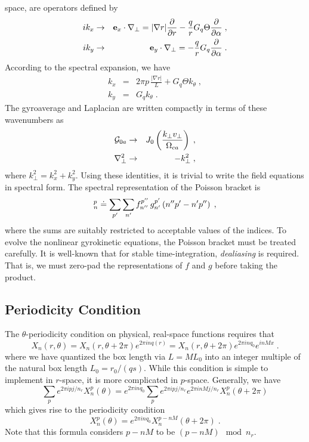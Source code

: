 \documentclass[11pt]{article}
\begin{document}
space, are operators defined by
%
\begin{eqnarray}
i k_x &\rightarrow& \mathbf{e}_x \cdot \nabla_\perp = |\nabla r| \frac{\partial}{\partial r} 
- \frac{q}{r} G_q \Theta \frac{\partial}{\partial \alpha} \; , \\
i k_y &\rightarrow& \mathbf{e}_y \cdot \nabla_\perp = 
- \frac{q}{r} G_q \frac{\partial}{\partial \alpha} \; .
\end{eqnarray}
%
According to the spectral expansion, we have
%
\begin{eqnarray}
k_x &=& 2\pi p \, \frac{|\nabla r|}{L} + G_q \Theta k_\theta \; , \\
k_y &=& G_q k_\theta \; .
\end{eqnarray}
%
The gyroaverage and Laplacian are written compactly in terms of these wavenumbers as
%
\begin{eqnarray}
{\cal G}_{0a} &\rightarrow& J_0\left(\frac{k_\perp v_\perp}{\Omega_{ca}}\right) \; , \\
\nabla_\perp^2 &\rightarrow& - k_\perp^2 \; ,
\end{eqnarray}
%
where $k_\perp^2 = k_x^2+k_y^2$.  Using these identities, it is trivial to write the 
field equations in spectral form.  The spectral representation of the Poisson 
bracket is
%
\begin{equation}
[f,g]_n^p \doteq \sum_{\pp} \sum_{\nn}  f_{\nnn}^{\ppp} \, 
g_{\nn}^{\pp} \left( \nnn \pp - \nn \ppp \right) \; ,
\end{equation}
%
where the sums are suitably restricted to acceptable values of the indices.  To evolve the 
nonlinear gyrokinetic equations, the Poisson bracket must be treated carefully.  It is 
well-known that for stable time-integration, {\it dealiasing} is required.  That is, 
we must zero-pad the representations of $f$ and $g$ before taking the product. 

\subsection{Periodicity Condition}
The $\theta$-periodicity condition on physical, real-space functions requires 
that
%
\begin{equation}
X_n(r,\theta) = 
 X_n(r,\theta + 2 \pi) e^{2 \pi i n q(r)} = 
 X_n(r,\theta + 2 \pi) e^{2 \pi i n q_0} e^{i n M x}\; .
\end{equation}
%
where we have quantized the box length via $L = M L_0$ into an integer 
multiple of the natural box length $L_0 = r_0/(qs)$.  While this condition 
is simple to implement in $r$-space, it is more complicated in $p$-space.
Generally, we have
\begin{equation}
\sum_p e^{2\pi i p j/n_r} X_n^p(\theta) = e^{2\pi i n q_0}
\sum_p e^{2\pi i p j/n_r}e^{2\pi i n M j/n_r} X_n^p(\theta+2\pi)
\end{equation}
%
which gives rise to the periodicity condition
%
\begin{equation}
X_n^p(\theta) = e^{2\pi i n q_0} X_n^{p-nM}(\theta+2\pi) \; .
\end{equation}
%
Note that this formula considers $p-nM$ to be $(p-nM) \mod n_r$.
\end{document}
